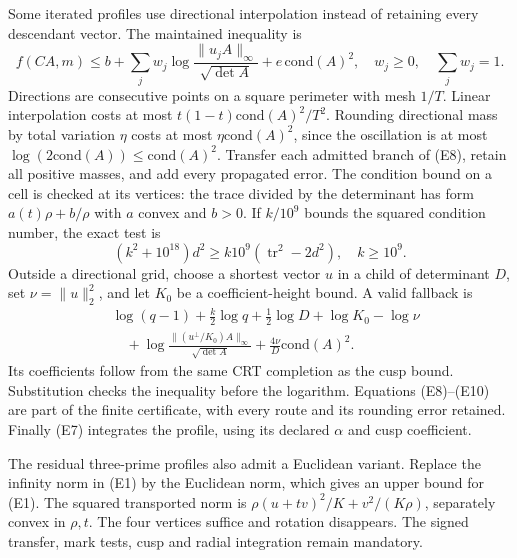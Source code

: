 \documentclass[11pt]{article}
\theoremstyle{definition}\newtheorem{definition}[theorem]{Definition}
\theoremstyle{remark}\newtheorem{remark}[theorem]{Remark}
\begin{document}
Some iterated profiles use directional interpolation instead of
retaining every descendant vector. The maintained inequality is
\[
 f(CA,m)\le b+\sum_j w_j\log\frac{\|u_jA\|_\infty}{\sqrt{\det A}}
                  +e\,\mathrm{cond}(A)^2,
 \quad w_j\ge0,\quad\sum_jw_j=1 .                                  \tag{E8}
\]
Directions are consecutive points on a square perimeter with mesh
\(1/T\). Linear interpolation costs at most
\(t(1-t)\mathrm{cond}(A)^2/T^2\). Rounding directional mass by total
variation \(\eta\) costs at most \(\eta\mathrm{cond}(A)^2\), since
the oscillation is at most \(\log(2\mathrm{cond}(A))\le
\mathrm{cond}(A)^2\). Transfer each admitted branch of (E8), retain
all positive masses, and add every propagated error. The condition
bound on a cell is checked at its vertices: the trace divided by the
determinant has form \(a(t)\rho+b/\rho\) with \(a\) convex and \(b>0\).
If \(k/10^9\) bounds the squared condition number, the exact test is
\[
 (k^2+10^{18})d^2\ge k10^9(\operatorname{tr}^2-2d^2),\quad k\ge10^9.
                                                                    \tag{E9}
\]
Outside a directional grid, choose a shortest vector \(u\) in a child
of determinant \(D\), set \(\nu=\|u\|_2^2\), and let \(K_0\) be a
coefficient-height bound. A valid fallback is
\[
\begin{split}
 &\log(q-1)+\tfrac k2\log q+\tfrac12\log D+\log K_0-\log\nu\\
 &\quad+\log\frac{\|(u^\perp/K_0)A\|_\infty}{\sqrt{\det A}}
       +\frac{4\nu}{D}\mathrm{cond}(A)^2 .
\end{split}                                                        \tag{E10}
\]
Its coefficients follow from the same CRT completion as the cusp
bound. Substitution checks the inequality before the logarithm.
Equations (E8)--(E10) are part of the finite certificate, with every
route and its rounding error retained. Finally (E7) integrates the
profile, using its declared \(\alpha\) and cusp coefficient.

The residual three-prime profiles also admit a Euclidean variant.
Replace the infinity norm in (E1) by the Euclidean norm, which gives
an upper bound for (E1). The squared transported norm is
\(\rho(u+tv)^2/K+v^2/(K\rho)\), separately convex in \(\rho,t\).
The four vertices suffice and rotation disappears. The signed transfer,
mark tests, cusp and radial integration remain mandatory.
\end{document}
